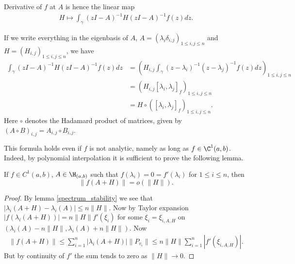 Derivative of $f$ at $A$ is hence the linear map
\begin{align*}
	H \mapsto \int_{\gamma} (z I - A)^{-1} H (z I - A)^{-1} f(z) dz.
\end{align*}

If we write everything in the eigenbasis of $A$, $A = (\lambda_{i} \delta_{i, j})_{1 \leq i, j \leq n}$ and $H = (H_{i, j})_{1 \leq i,j \leq n}$, we have
\begin{align*}
	\int_{\gamma} (z I - A)^{-1} H (z I - A)^{-1} f(z) dz &= \left(H_{i, j} \int_{\gamma} (z - \lambda_{i})^{-1} (z - \lambda_{j})^{-1} f(z) dz \right)_{1 \leq i, j \leq n} \\
	&= \left(H_{i, j} [\lambda_{i}, \lambda_{j}]_{f} \right)_{1 \leq i, j \leq n} \\
	&= H \circ \left([\lambda_{i}, \lambda_{j}]_{f} \right)_{1 \leq i, j \leq n}.
\end{align*}
Here $\circ$ denotes the Hadamard product of matrices, given by $(A \circ B)_{i, j} = A_{i, j} \circ B_{i, j}$.

This formula holds even if $f$ is not analytic, namely as long as $f \in \C^{1}(a, b)$. Indeed, by polynomial interpolation it is sufficient to prove the following lemma.
\begin{lem}
	If $f \in C^{1}(a, b)$, $A \in \H_{(a, b)}$ such that $f(\lambda_{i}) = 0 = f'(\lambda_{i})$ for $1 \leq i \leq n$, then
	\[
		\|f(A + H)\| = o(\|H\|).
	\]
\end{lem}
\begin{proof}
	By lemma \ref{spectrum_stability} we see that $|\lambda_{i}(A + H) - \lambda_{i}(A)| \leq n \|H\|$. Now by Taylor expansion $|f(\lambda_{i}(A + H))| =  n \|H\| f'(\xi_{i})$ for some $\xi_{i} = \xi_{i, A, H}$ on $(\lambda_{i}(A) - n \|H\|, \lambda_{i}(A) + n \|H\|)$. Now
	\begin{align*}
		\|f(A + H)\| \leq \sum_{i = 1}^{n} |\lambda_{i}(A + H)| \|P_{v_{i}}\| \leq n \|H\| \sum_{i = 1}^{n} |f'(\xi_{i, A, H})|.
	\end{align*}
	But by continuity of $f'$ the sum tends to zero as $\|H\| \to 0$.
\end{proof}


